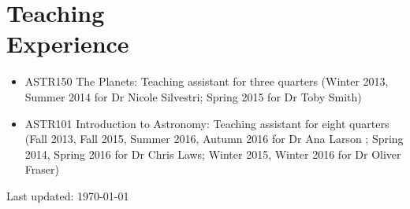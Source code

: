\documentclass[margin]{res}
\begin{document}
\begin{resume}
\begin{itemize}
\end{itemize}


\section{Teaching \\Experience}
\begin{itemize}   
	
\item ASTR150 The Planets: Teaching assistant for  three quarters (Winter 2013, Summer 2014 for Dr Nicole Silvestri; Spring 2015 for Dr Toby Smith)

\item ASTR101 Introduction to Astronomy: Teaching assistant for  eight quarters (Fall 2013, Fall 2015, Summer 2016, Autumn 2016 for Dr Ana Larson ; Spring 2014, Spring 2016 for Dr Chris Laws; Winter 2015, Winter 2016 for Dr Oliver Fraser) \\
\end{itemize}


\vfill \hfill {\small Last updated: \today}
\end{resume}
\end{document}

